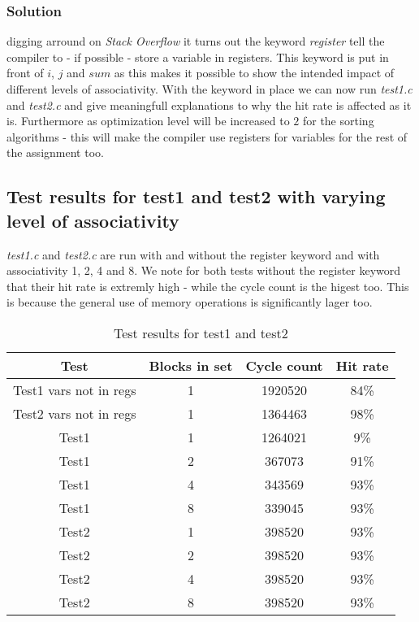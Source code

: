 \subsubsection{Solution} digging arround on \emph{Stack Overflow}
\cite{StackRegPost} it turns out the keyword \emph{register} tell the compiler
to - if possible - store a variable in registers. This keyword is put in front of $i$, $j$ and $sum$ as this makes it
possible to show the intended impact of different levels of associativity. With
the keyword in place we can now run \emph{test1.c} and \emph{test2.c} and give
meaningfull explanations to why the hit rate is affected as it is. Furthermore
as optimization level will be increased to $2$ for the sorting algorithms - this
will make the compiler use registers for variables for the rest of the
assignment too.

\subsection{Test results for test1 and test2 with varying level of
associativity}
\emph{test1.c} and \emph{test2.c} are run with and without the register keyword
and with associativity 1, 2, 4 and 8. We note for both tests without the
register keyword that their hit rate is extremly high - while the cycle count is
the higest too. This is because the general use of memory operations is
significantly lager too.

\begin{table}[H]
  \centering
  \begin{tabular}{c | c | c | c |}
    Test	&	Blocks in set	&	Cycle count	&	Hit rate	\\ \hline
    Test1 vars not in regs
    		&	1				&	1920520		&	84\%		\\ \hline
    Test2 vars not in regs
    		&	1				&	1364463		&	98\%		\\ \hline \hline
    Test1	&	1				&	1264021		&	9\%			\\ \hline
    Test1	&	2				&	367073		&	91\%		\\ \hline
    Test1	&	4				&	343569		&	93\%		\\ \hline
    Test1	&	8				&	339045		&	93\%		\\ \hline \hline
    Test2	&	1				&	398520		&	93\%		\\ \hline
    Test2	&	2				&	398520		&	93\%		\\ \hline
    Test2	&	4				&	398520		&	93\%		\\ \hline
    Test2	&	8				&	398520		&	93\%		\\ \hline 
  \end{tabular}
  \caption{Test results for test1 and test2}
  \label{tab:test}
\end{table}

